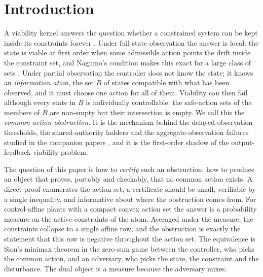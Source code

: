 \section{Introduction}\label{sec:intro}

A viability kernel answers the question whether a constrained system can be kept inside its constraints forever \cite{Aubin1991,Aubin2011,Blanchini1999}. Under full state observation the answer is local: the state is viable at first order when some admissible action points the drift inside the constraint set, and Nagumo's condition makes this exact for a large class of sets \cite{Nagumo1942}. Under partial observation the controller does not know the state; it knows an \emph{information atom}, the set $B$ of states compatible with what has been observed, and it must choose one action for all of them. Viability can then fail although every state in $B$ is individually controllable: the safe-action sets of the members of $B$ are non-empty but their intersection is empty. We call this the \emph{common-action obstruction}. It is the mechanism behind the delayed-observation thresholds, the shared-authority ladders and the aggregate-observation failures studied in the companion papers \cite{Abaee2026calc,Abaee2026cert,Abaee2026prob}, and it is the first-order shadow of the output-feedback viability problem.

The question of this paper is how to \emph{certify} such an obstruction: how to produce an object that proves, portably and checkably, that no common action exists. A direct proof enumerates the action set; a certificate should be small, verifiable by a single inequality, and informative about where the obstruction comes from. For control-affine plants with a compact convex action set the answer is a probability measure on the active constraints of the atom. Averaged under the measure, the constraints collapse to a single affine row, and the obstruction is exactly the statement that this row is negative throughout the action set. The equivalence is Sion's minimax theorem in the zero-sum game between the controller, who picks the common action, and an adversary, who picks the state, the constraint and the disturbance. The dual object is a measure because the adversary mixes.

